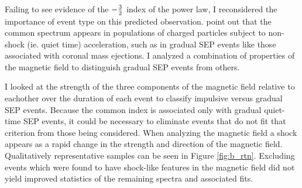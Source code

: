 \documentclass[letterpaper,11pt]{article}
\begin{document}
Failing to see evidence of the $-{3 \over 2}$ index of the power law, I reconsidered the importance of event type on this predicted observation.  \citet{Fisk2006} point out that the common spectrum appears in populations of charged particles subject to non-shock (ie. quiet time) acceleration, such as in gradual SEP events like those associated with coronal mass ejections.  I analyzed a combination of properties of the magnetic field to distinguish gradual SEP events from others.  

I looked at the strength of the three components of the magnetic field relative to eachother over the duration of each event to classify impulsive versus gradual SEP events.  Because the common index is associated only with gradual quiet-time SEP events, it could be necessary to eliminate events that do not fit that criterion from those being considered.  When analyzing the magnetic field a shock appears as a rapid change in the strength and direction of the magnetic field.  Qualitatively representative samples can be seen in Figure \ref{fig:b_rtn}.  Excluding events which were found to have shock-like features in the magnetic field did not yield improved statistics of the remaining spectra and associated fits.
\end{document}
